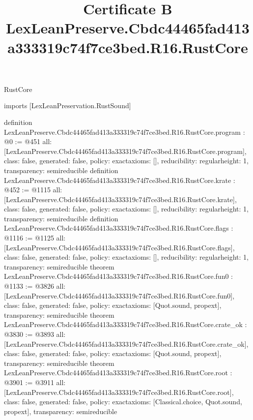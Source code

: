 \begin{lexlean}{RustCore}
\title{Certificate B LexLeanPreserve.Cbdc44465fad413a333319c74f7ce3bed.R16.RustCore}
\begin{coremodule}
imports [LexLeanPreservation.RustSound]

definition LexLeanPreserve.Cbdc44465fad413a333319c74f7ce3bed.R16.RustCore.program : @0 := @451 {
  all: [LexLeanPreserve.Cbdc44465fad413a333319c74f7ce3bed.R16.RustCore.program],
  class: false,
  generated: false,
  policy: exact{axioms: []},
  reducibility: regular{height: 1},
  transparency: semireducible
}
definition LexLeanPreserve.Cbdc44465fad413a333319c74f7ce3bed.R16.RustCore.krate : @452 := @1115 {
  all: [LexLeanPreserve.Cbdc44465fad413a333319c74f7ce3bed.R16.RustCore.krate],
  class: false,
  generated: false,
  policy: exact{axioms: []},
  reducibility: regular{height: 1},
  transparency: semireducible
}
definition LexLeanPreserve.Cbdc44465fad413a333319c74f7ce3bed.R16.RustCore.flags : @1116 := @1125 {
  all: [LexLeanPreserve.Cbdc44465fad413a333319c74f7ce3bed.R16.RustCore.flags],
  class: false,
  generated: false,
  policy: exact{axioms: []},
  reducibility: regular{height: 1},
  transparency: semireducible
}
theorem LexLeanPreserve.Cbdc44465fad413a333319c74f7ce3bed.R16.RustCore.fun0 : @1133 := @3826 {
  all: [LexLeanPreserve.Cbdc44465fad413a333319c74f7ce3bed.R16.RustCore.fun0],
  class: false,
  generated: false,
  policy: exact{axioms: [Quot.sound, propext]},
  transparency: semireducible
}
theorem LexLeanPreserve.Cbdc44465fad413a333319c74f7ce3bed.R16.RustCore.crate_ok : @3830 := @3893 {
  all: [LexLeanPreserve.Cbdc44465fad413a333319c74f7ce3bed.R16.RustCore.crate_ok],
  class: false,
  generated: false,
  policy: exact{axioms: [Quot.sound, propext]},
  transparency: semireducible
}
theorem LexLeanPreserve.Cbdc44465fad413a333319c74f7ce3bed.R16.RustCore.root : @3901 := @3911 {
  all: [LexLeanPreserve.Cbdc44465fad413a333319c74f7ce3bed.R16.RustCore.root],
  class: false,
  generated: false,
  policy: exact{axioms: [Classical.choice, Quot.sound, propext]},
  transparency: semireducible
}


\end{coremodule}
\end{lexlean}
